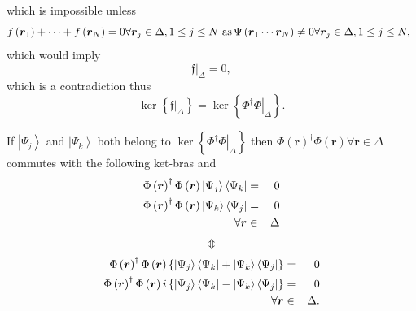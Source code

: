 \documentclass[12pt]{article}
\begin{document}
which is impossible unless 
\begin{equation}
f\left( \boldsymbol{r}_{1}\right) +\cdots +f\left( \boldsymbol{r}_{N}\right)
=0\forall \boldsymbol{r}_{j}\in \Delta ,1\leq j\leq N\text{ as\thinspace }%
\Psi \left( \boldsymbol{r}_{1}\cdots \boldsymbol{r}_{N}\right) \neq 0\forall 
\boldsymbol{r}_{j}\in \Delta ,1\leq j\leq N,\text{ }
\end{equation}%
which would imply 
\begin{equation}
\left. \mathfrak{f}\right\vert _{\Delta }=0,
\end{equation}%
which is a contradiction thus  
\begin{equation}
\ker \left\{ \left. \mathfrak{f}\right\vert _{\Delta }\right\} =\ker \left\{
\left. \Phi ^{\dagger }\Phi \right\vert _{\Delta }\right\} .
\end{equation}

If $\left\vert \Psi _{j}\right\rangle $ and $\left\vert \Psi
_{k}\right\rangle $ both belong to $\ker \left\{ \left. \Phi ^{\dagger }\Phi
\right\vert _{\Delta }\right\} $ then $\Phi \left( \boldsymbol{r}\right)
^{\dagger }\Phi \left( \boldsymbol{r}\right) \forall \boldsymbol{r}\in
\Delta $ commutes with the following ket-bras and%
\begin{eqnarray}
\Phi \left( \boldsymbol{r}\right) ^{\dagger }\Phi \left( \boldsymbol{r}%
\right) \left\vert \Psi _{j}\right\rangle \left\langle \Psi _{k}\right\vert 
&=&0  \notag \\
\Phi \left( \boldsymbol{r}\right) ^{\dagger }\Phi \left( \boldsymbol{r}%
\right) \left\vert \Psi _{k}\right\rangle \left\langle \Psi _{j}\right\vert 
&=&0  \notag \\
\forall \boldsymbol{r} &\in &\Delta 
\end{eqnarray}%
\begin{equation}
\Updownarrow 
\end{equation}
\begin{eqnarray}
\Phi \left( \boldsymbol{r}\right) ^{\dagger }\Phi \left( \boldsymbol{r}%
\right) \left\{ \left\vert \Psi _{j}\right\rangle \left\langle \Psi
_{k}\right\vert +\left\vert \Psi _{k}\right\rangle \left\langle \Psi
_{j}\right\vert \right\}  &=&0  \notag \\
\Phi \left( \boldsymbol{r}\right) ^{\dagger }\Phi \left( \boldsymbol{r}%
\right) i\left\{ \left\vert \Psi _{j}\right\rangle \left\langle \Psi
_{k}\right\vert -\left\vert \Psi _{k}\right\rangle \left\langle \Psi
_{j}\right\vert \right\}  &=&0  \notag \\
\forall \boldsymbol{r} &\in &\Delta .
\end{eqnarray}
\end{document}

